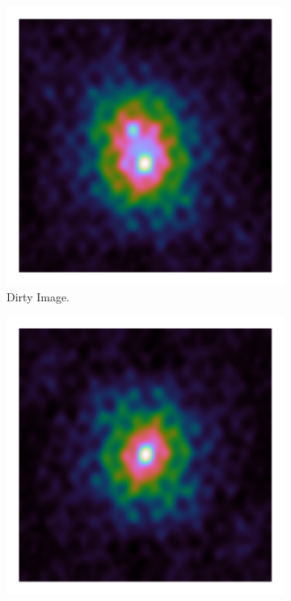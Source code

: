 \begin{figure}[h]
	\centering
	\begin{subfigure}[b]{0.3\linewidth}
		\includegraphics[width=\linewidth, clip, trim= 0.25in 0.25in 0.25in 0.25in]{./chapters/03.cd/simulated/dirty.png}
		\caption{Dirty Image.}
		\label{cd:serial:aid:dirty}
	\end{subfigure}
	\begin{subfigure}[b]{0.3\linewidth}
		\includegraphics[width=\linewidth, clip, trim= 0.25in 0.25in 0.25in 0.25in]{./chapters/03.cd/simulated/psf.png}

\end{subfigure}
\end{figure}
